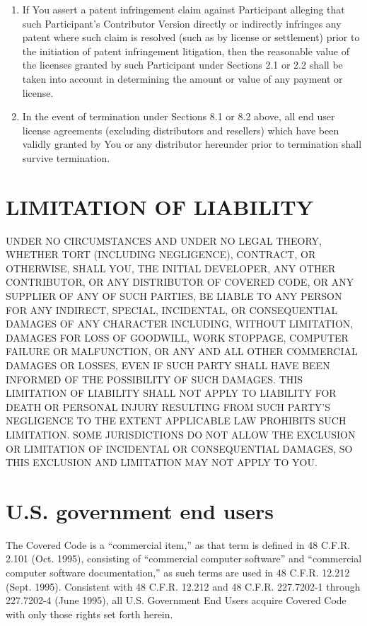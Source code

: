 \documentclass[letterpaper,colorlinks=true,linkcolor=blue]{book}
\begin{document}
\begin{enumerate}
\item If You assert a patent infringement claim against Participant alleging that such Participant's Contributor Version directly or indirectly infringes any patent where such claim is resolved (such as by license or settlement) prior to the initiation of patent infringement litigation, then the reasonable value of the licenses granted by such Participant under Sections 2.1 or 2.2 shall be taken into account in determining the amount or value of any payment or license. 

\item In the event of termination under Sections 8.1 or 8.2 above, all end user license agreements (excluding distributors and resellers) which have been validly granted by You or any distributor hereunder prior to termination shall survive termination. 
\end{enumerate}

\section{LIMITATION OF LIABILITY}
UNDER NO CIRCUMSTANCES AND UNDER NO LEGAL THEORY, WHETHER TORT (INCLUDING NEGLIGENCE), CONTRACT, OR OTHERWISE, SHALL YOU, THE INITIAL DEVELOPER, ANY OTHER CONTRIBUTOR, OR ANY DISTRIBUTOR OF COVERED CODE, OR ANY SUPPLIER OF ANY OF SUCH PARTIES, BE LIABLE TO ANY PERSON FOR ANY INDIRECT, SPECIAL, INCIDENTAL, OR CONSEQUENTIAL DAMAGES OF ANY CHARACTER INCLUDING, WITHOUT LIMITATION, DAMAGES FOR LOSS OF GOODWILL, WORK STOPPAGE, COMPUTER FAILURE OR MALFUNCTION, OR ANY AND ALL OTHER COMMERCIAL DAMAGES OR LOSSES, EVEN IF SUCH PARTY SHALL HAVE BEEN INFORMED OF THE POSSIBILITY OF SUCH DAMAGES. THIS LIMITATION OF LIABILITY SHALL NOT APPLY TO LIABILITY FOR DEATH OR PERSONAL INJURY RESULTING FROM SUCH PARTY'S NEGLIGENCE TO THE EXTENT APPLICABLE LAW PROHIBITS SUCH LIMITATION. SOME JURISDICTIONS DO NOT ALLOW THE EXCLUSION OR LIMITATION OF INCIDENTAL OR CONSEQUENTIAL DAMAGES, SO THIS EXCLUSION AND LIMITATION MAY NOT APPLY TO YOU. 

\section{U.S. government end users}
The Covered Code is a ``commercial item,'' as that term is defined in 48 C.F.R. 2.101 (Oct. 1995), consisting of ``commercial computer software'' and ``commercial computer software documentation,'' as such terms are used in 48 C.F.R. 12.212 (Sept. 1995). Consistent with 48 C.F.R. 12.212 and 48 C.F.R. 227.7202-1 through 227.7202-4 (June 1995), all U.S. Government End Users acquire Covered Code with only those rights set forth herein. 
\end{document}

